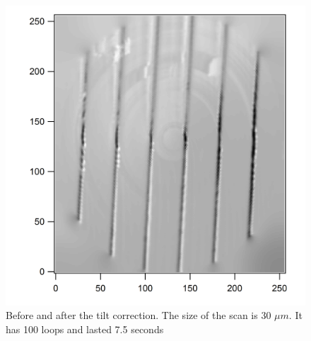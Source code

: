 \begin{figure}[ht]
\begin{minipage}[b]{0.45\linewidth}
\end{minipage}
\hspace{0.5cm}
\begin{minipage}[b]{0.45\linewidth}
\centering
\includegraphics[width=\textwidth]{images/TiltSession0226wc_35.png}
\end{minipage}
\caption{Before and after the tilt correction. The size of the scan is 30 $\mu m$. It has 100 loops and lasted 7.5 seconds}
\label{fig:tiltimages}
\end{figure}



